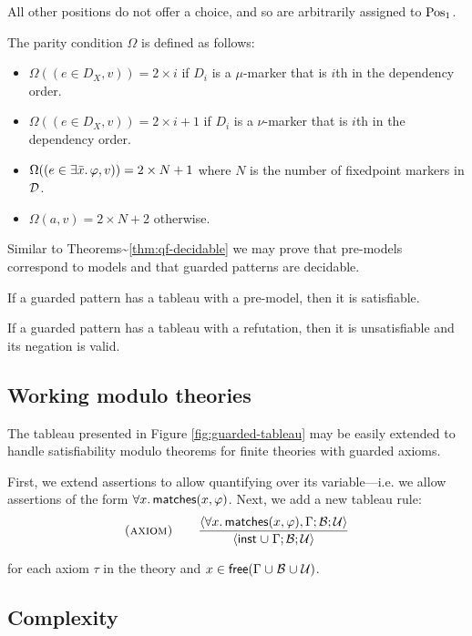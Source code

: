 All other positions do not offer a choice, and so are arbitrarily assigned to \(\Pos_1\).

The parity condition \(\Omega\) is defined as follows:

\begin{itemize}
\tightlist
\item
  \(\Omega((e \in D_X, v)) = 2 \times i\) if \(D_i\) is a \(\mu\)-marker that is \(i\)th in the dependency order.
\item
  \(\Omega((e \in D_X, v)) = 2 \times i + 1\) if \(D_i\) is a \(\nu\)-marker that is \(i\)th in the dependency order.
\item
  \(\Omega((e \in \exists \bar x\ldotp \phi, v)) = 2 \times N + 1\) where \(N\) is the number of fixedpoint markers in \(\deflist\).
\item
  \(\Omega(a, v) = 2 \times N + 2\) otherwise.
\end{itemize}

Similar to Theorems\textasciitilde{}\ref{thm:qf-decidable}
we may prove that pre-models correspond to models and that guarded patterns are decidable.

\begin{theorem}If a guarded pattern has a tableau with a pre-model, then it is satisfiable.\end{theorem}

\begin{theorem}\label{theorem:validity}
If a guarded pattern has a tableau with a refutation, then it is unsatisfiable
and its negation is valid.\end{theorem}

\hypertarget{working-modulo-theories}{%
\subsection{Working modulo theories}\label{working-modulo-theories}}

The tableau presented in Figure \ref{fig:guarded-tableau} may be easily extended to handle
satisfiability modulo theorems for finite theories with guarded axioms.

First, we extend assertions to allow quantifying over its variable---i.e.
we allow assertions of the form \(\forall x \ldotp \matches{x}{\phi}\).
Next, we add a new tableau rule:
\[
\text{\prule{axiom}}\qquad
\pruleun{\sequent{\forall x \ldotp \matches{x}{\phi},\Gamma;\Basic;\Universals}}
        {\sequent{\inst \union \Gamma;\Basic;\Universals}}
\]

for each axiom \(\tau\) in the theory and \(x \in \free{\Gamma\union\Basic\union\Universals}\).

\hypertarget{complexity}{%
\subsection{Complexity}\label{complexity}}
